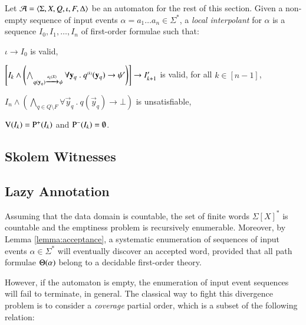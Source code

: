 \documentclass{llncs}
\begin{document}
Let $\mathcal{A} = \langle \Sigma,X,Q,\iota,F,\Delta \rangle$ be an automaton for the
rest of this section. Given a non-empty sequence of input events
$\alpha = a_1 \ldots a_n \in \Sigma^*$, a \emph{local interpolant} for
$\alpha$ is a sequence $I_0,I_1,\ldots,I_n$ of first-order formulae
such that: \begin{compactitem}
\item $\iota \rightarrow I_0$ is valid, 
%
\item $\left[I_k \wedge \left(\bigwedge_{q(\mathbf y_q) \xrightarrow{{\scriptscriptstyle a_i(X)}}_{{\scriptstyle }} \psi}
  \forall \mathbf y_q ~.~ {q}^{\scriptscriptstyle{({k})}}(\mathbf y_q) \rightarrow
  {\psi}^\prime\right)\right] \rightarrow {I}^\prime_{k+1}$ is valid, for all $k \in [n-1]$,
%
\item $I_n \wedge \left(\bigwedge_{q \in Q \setminus F} \forall \vec{y}_q
  ~.~ q(\vec{y}_q) \rightarrow \bot\right)$ is unsatisfiable,
%
\item $\mathrm{V}({I_k}) = \mathrm{P}^{+}(I_k)$ and $\mathrm{P}^{-}(I_k) = \emptyset$. 
\end{compactitem}

\begin{lemma}\label{lemma:lyndon-existence}
  
\end{lemma}

\subsection{Skolem Witnesses} 

\subsection{Lazy Annotation} 


Assuming that the data domain is countable, the set of finite words
$\Sigma[X]^*$ is countable and the emptiness problem is recursively
enumerable. Moreover, by Lemma \ref{lemma:acceptance}, a systematic
enumeration of sequences of input events $\alpha \in \Sigma^*$ will
eventually discover an accepted word, provided that all path formulae
$\Theta({\alpha})$ belong to a decidable first-order theory.




However, if the automaton is empty, the enumeration of input event
sequences will fail to terminate, in general. The classical way to
fight this divergence problem is to consider a \emph{coverage} partial
order, which is a subset of the following relation: 
\end{document}
